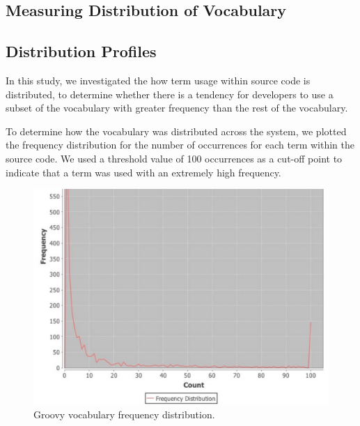 \subsection{Measuring Distribution of Vocabulary} %
\label{sub:measuring_distribution_of_vocabulary}




\subsection{Distribution Profiles} %
\label{sub:distribution_profiles}


In this study, we investigated the how term usage within source code is distributed, to determine whether there is a tendency for developers to use a subset of the vocabulary with greater frequency than the rest of the vocabulary.

To determine how the vocabulary was distributed across the system, we plotted the frequency distribution for the number of occurrences for each term within the source code. We used a threshold value of 100 occurrences as a cut-off point to indicate that a term was used with an extremely high frequency.



\begin{figure}[t]
\centering
\includegraphics[width=\textwidth]{Figures/Vocab-GroovyFreqDist.pdf}
\caption{Groovy vocabulary frequency distribution.}
\label{fig:vocab-freq-dist-groovy}
\end{figure}

